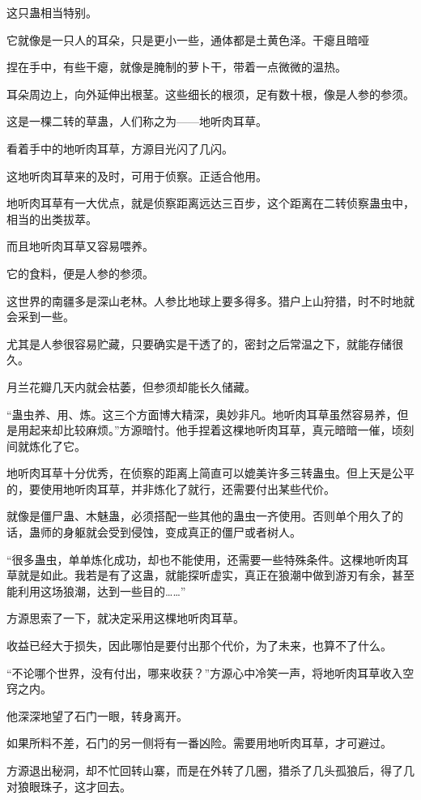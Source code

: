 \begin{this_body}
这只蛊相当特别。

它就像是一只人的耳朵，只是更小一些，通体都是土黄色泽。干瘪且暗哑

捏在手中，有些干瘪，就像是腌制的萝卜干，带着一点微微的温热。

耳朵周边上，向外延伸出根茎。这些细长的根须，足有数十根，像是人参的参须。

这是一棵二转的草蛊，人们称之为——地听肉耳草。

看着手中的地听肉耳草，方源目光闪了几闪。

这地听肉耳草来的及时，可用于侦察。正适合他用。

地听肉耳草有一大优点，就是侦察距离远达三百步，这个距离在二转侦察蛊虫中，相当的出类拔萃。

而且地听肉耳草又容易喂养。

它的食料，便是人参的参须。

这世界的南疆多是深山老林。人参比地球上要多得多。猎户上山狩猎，时不时地就会采到一些。

尤其是人参很容易贮藏，只要确实是干透了的，密封之后常温之下，就能存储很久。

月兰花瓣几天内就会枯萎，但参须却能长久储藏。

“蛊虫养、用、炼。这三个方面博大精深，奥妙非凡。地听肉耳草虽然容易养，但是用起来却比较麻烦。”方源暗忖。他手捏着这棵地听肉耳草，真元暗暗一催，顷刻间就炼化了它。

地听肉耳草十分优秀，在侦察的距离上简直可以媲美许多三转蛊虫。但上天是公平的，要使用地听肉耳草，并非炼化了就行，还需要付出某些代价。

就像是僵尸蛊、木魅蛊，必须搭配一些其他的蛊虫一齐使用。否则单个用久了的话，蛊师的身躯就会受到侵蚀，变成真正的僵尸或者树人。

“很多蛊虫，单单炼化成功，却也不能使用，还需要一些特殊条件。这棵地听肉耳草就是如此。我若是有了这蛊，就能探听虚实，真正在狼潮中做到游刃有余，甚至能利用这场狼潮，达到一些目的……”

方源思索了一下，就决定采用这棵地听肉耳草。

收益已经大于损失，因此哪怕是要付出那个代价，为了未来，也算不了什么。

“不论哪个世界，没有付出，哪来收获？”方源心中冷笑一声，将地听肉耳草收入空窍之内。

他深深地望了石门一眼，转身离开。

如果所料不差，石门的另一侧将有一番凶险。需要用地听肉耳草，才可避过。

方源退出秘洞，却不忙回转山寨，而是在外转了几圈，猎杀了几头孤狼后，得了几对狼眼珠子，这才回去。


\end{this_body}
